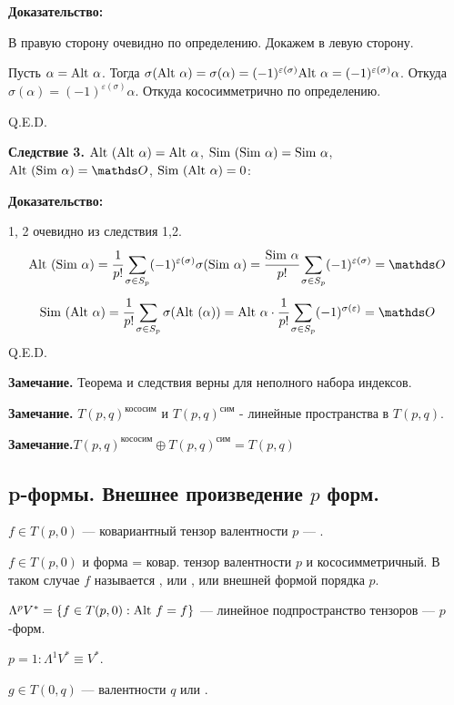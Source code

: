 \textbf{Доказательство:}

В правую сторону очевидно по определению. Докажем в левую сторону.

Пусть $\alpha = \text{Alt } \alpha$. Тогда $\sigma(\text{Alt } \alpha) = \sigma(\alpha) = (-1)^{\varepsilon(\sigma)}\text{Alt } \alpha = (-1)^{\varepsilon(\sigma)}\alpha$. Откуда $\sigma(\alpha) = (-1)^{\varepsilon(\sigma)} \alpha$. Откуда кососимметрично по определению.

\hfill Q.E.D.

\textbf{Следствие 3.} $\text{Alt }(\text{Alt } \alpha) = \text{Alt } \alpha$, $\text{Sim }(\text{Sim } \alpha) = \text{Sim } \alpha$, $\Alt(\Sim \alpha) = \zero$, $\text{Sim }(\text{Alt } \alpha) = 0$:

\textbf{Доказательство:}

1, 2 очевидно из следствия 1,2.
$$\Alt(\Sim \alpha) = \cfrac{1}{p!}\sum\limits_{\sigma \in S_p}(-1)^{\varepsilon(\sigma)}\sigma(\Sim \alpha) = \cfrac{\Sim \alpha}{p!}\sum\limits_{\sigma \in S_p}(-1)^{\varepsilon(\sigma)} = \zero$$
$$\Sim (\Alt \alpha) = \cfrac{1}{p!}\sum\limits_{\sigma \in S_p}\sigma(\Alt(\alpha)) = \Alt\alpha \cdot \cfrac{1}{p!}\sum\limits_{\sigma \in S_p} (-1)^{\sigma(\varepsilon)} =\zero$$
\hfill Q.E.D.

\textbf{Замечание.} Теорема и следствия верны для неполного набора индексов.

\textbf{Замечание.} $T(p,q)^{\text{кососим}}$ и  $T(p,q)^{\text{сим}}$ - линейные пространства в $T(p,q)$.

\textbf{Замечание.}$T(p,q)^{\text{кососим}} \oplus T(p,q)^{\text{сим}} = T(p,q)$

\pagebreak

\subsection{p-формы. Внешнее произведение $p$ форм.}

 $f \in T(p,0)$ --- ковариантный тензор валентности $p$ --- .

$f \in T(p,0)$ и  форма = ковар. тензор валентности $p$ и кососимметричный. В таком случае $f$ называется , или , или внешней формой порядка $p$. 

$\Lambda^pV^* = \{f \in T(p,0): \text{Alt } f = f\}$ --- линейное подпространство тензоров ---  $p$-форм.

$p = 1: \Lambda^1 V^* \equiv V^*$.

 $g\in T(0,q)$ ---  валентности $q$ или .


